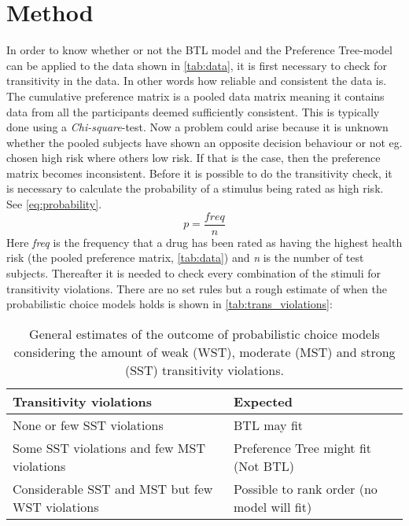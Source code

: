 \section*{Method}
\label{Method}
%
In order to know whether or not the BTL model and the Preference Tree-model can be applied to the data shown in \autoref{tab:data}, it is first necessary to check for transitivity in the data. In other words how reliable and consistent the data is. The cumulative preference matrix is a pooled data matrix meaning it contains data from all the participants deemed sufficiently consistent. This is typically done using a \textit{Chi-square}-test. Now a problem could arise because it is unknown whether the pooled subjects have shown an opposite decision behaviour or not eg. chosen high risk where others low risk. If that is the case, then the preference matrix becomes inconsistent. Before it is possible to do the transitivity check, it is necessary to calculate the probability of a stimulus being rated as high risk. See \autoref{eq:probability}.
%
\begin{equation}
p = \frac{freq}{n}
\label{eq:probability}
\end{equation}
\noindent
%
Here \textit{freq} is the frequency that a drug has been rated as having the highest health risk (the pooled preference matrix, \autoref{tab:data}) and \textit{n} is the number of test subjects. Thereafter it is needed to check every combination of the stimuli for transitivity violations. There are no set rules but a rough estimate of when the probabilistic choice models holds is shown in \autoref{tab:trans_violations}:
%
\begin{table}[H]
\centering
\begin{tabular}{@{}ll@{}}
\toprule
Transitivity violations                                    & Expected                                      \\ \midrule
None or few SST violations                                 & BTL may fit                                   \\
Some SST violations and few MST violations                 & Preference Tree might fit (Not BTL)            \\
Considerable SST and MST but few WST violations & Possible to rank order (no model will fit) \\ \bottomrule
\end{tabular}
\caption{General estimates of the outcome of probabilistic choice models considering the amount of weak (WST), moderate (MST) and strong (SST) transitivity violations.}
\label{tab:trans_violations}
\end{table}
